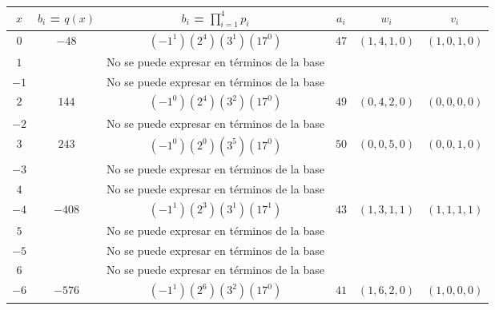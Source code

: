 \documentclass[letterpaper,11pt]{article}
\begin{document}
\begin{enumerate}
\begin{enumerate}
        \begin{center}
            \begin{tabular}{|c|c|c|c|c|c|} 
            \hline
            $x$ & $b_{i}$ = $q(x)$ & $b_{i}$ = $\prod_{i=1}^{4} p_{i}$ & 
            $a_{i}$ & $w_{i}$ & $v_{i}$ \\ \hline
            $0$ & $-48$ & $(-1^1)(2^4)(3^1)(17^0)$ & $47$ & $(1,4,1,0)$ & 
            $(1,0,1,0)$ \\ \hline
            $1$ & & No se puede expresar en términos de la base & & & \\ \hline
            $-1$ & & No se puede expresar en términos de la base & & & \\ \hline
            $2$ & $144$ & $(-1^0)(2^4)(3^2)(17^0)$ & $49$ & $(0,4,2,0)$ & 
            $(0,0,0,0)$ \\ \hline
            $-2$ & & No se puede expresar en términos de la base & & & \\ \hline
            $3$ & $243$ & $(-1^0)(2^0)(3^5)(17^0)$ & $50$ & $(0,0,5,0)$ & 
            $(0,0,1,0)$ \\ \hline
            $-3$ & & No se puede expresar en términos de la base & & & \\ \hline
            $4$ & & No se puede expresar en términos de la base & & & \\ \hline
            $-4$ & $-408$ & $(-1^1)(2^3)(3^1)(17^1)$ & $43$ & $(1,3,1,1)$ & 
            $(1,1,1,1)$ \\ \hline
            $5$ & & No se puede expresar en términos de la base & & & \\ \hline
            $-5$ & & No se puede expresar en términos de la base & & & \\ \hline
            $6$ & & No se puede expresar en términos de la base & & & \\ \hline
            $-6$ & $-576$ & $(-1^1)(2^6)(3^2)(17^0)$ & $41$ & $(1,6,2,0)$ & 
            $(1,0,0,0)$ \\ \hline
            \end{tabular}
        \end{center}
        

\end{enumerate}
\end{enumerate}
\end{document}
